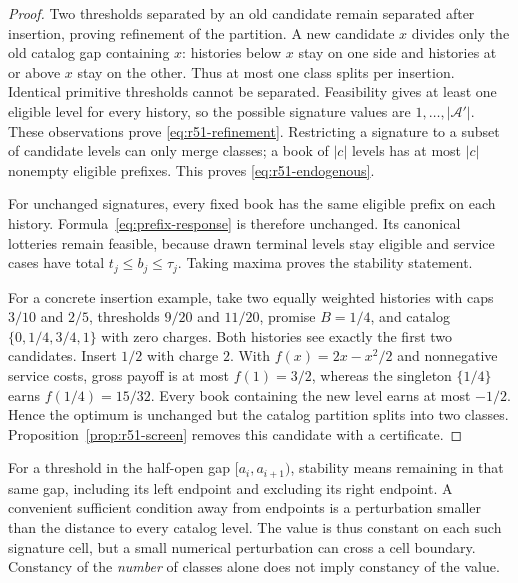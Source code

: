 \begin{proof}
Two thresholds separated by an old candidate remain separated after insertion, proving refinement of the partition. A new candidate $x$ divides only the old catalog gap containing $x$: histories below $x$ stay on one side and histories at or above $x$ stay on the other. Thus at most one class splits per insertion. Identical primitive thresholds cannot be separated. Feasibility gives at least one eligible level for every history, so the possible signature values are $1,\ldots,|\mathcal A'|$. These observations prove \eqref{eq:r51-refinement}. Restricting a signature to a subset of candidate levels can only merge classes; a book of $|c|$ levels has at most $|c|$ nonempty eligible prefixes. This proves \eqref{eq:r51-endogenous}.

For unchanged signatures, every fixed book has the same eligible prefix on each history. Formula~\eqref{eq:prefix-response} is therefore unchanged. Its canonical lotteries remain feasible, because drawn terminal levels stay eligible and service cases have total $t_j\leq b_j\leq\tau_j$. Taking maxima proves the stability statement.

For a concrete insertion example, take two equally weighted histories with caps $3/10$ and $2/5$, thresholds $9/20$ and $11/20$, promise $B=1/4$, and catalog $\{0,1/4,3/4,1\}$ with zero charges. Both histories see exactly the first two candidates. Insert $1/2$ with charge $2$. With $f(x)=2x-x^2/2$ and nonnegative service costs, gross payoff is at most $f(1)=3/2$, whereas the singleton $\{1/4\}$ earns $f(1/4)=15/32$. Every book containing the new level earns at most $-1/2$. Hence the optimum is unchanged but the catalog partition splits into two classes. Proposition~\ref{prop:r51-screen} removes this candidate with a certificate.
\end{proof}

For a threshold in the half-open gap $[a_i,a_{i+1})$, stability means remaining in that same gap, including its left endpoint and excluding its right endpoint. A convenient sufficient condition away from endpoints is a perturbation smaller than the distance to every catalog level. The value is thus constant on each such signature cell, but a small numerical perturbation can cross a cell boundary. Constancy of the \emph{number} of classes alone does not imply constancy of the value.

